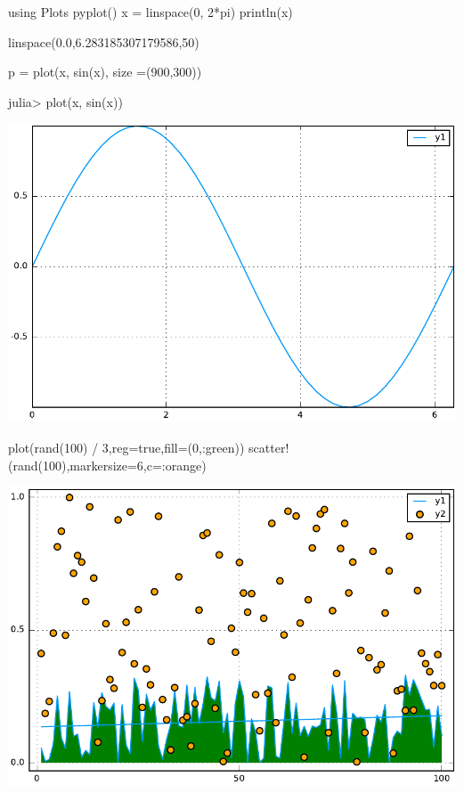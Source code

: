 

\begin{juliacode}
using Plots
pyplot()
x = linspace(0, 2*pi)
println(x)

\end{juliacode}
\begin{juliaout}
linspace(0.0,6.283185307179586,50)
\end{juliaout}

\begin{juliacode}
p = plot(x, sin(x), size =(900,300))
\end{juliacode}




\begin{juliaterm}
julia> plot(x, sin(x))

\end{juliaterm}
\includegraphics[width=\linewidth]{figures/plotsjl_test_2_1.pdf}



\begin{juliacode}
plot(rand(100) / 3,reg=true,fill=(0,:green))
scatter!(rand(100),markersize=6,c=:orange)
\end{juliacode}
\includegraphics[width=\linewidth]{figures/plotsjl_test_3_1.pdf}




